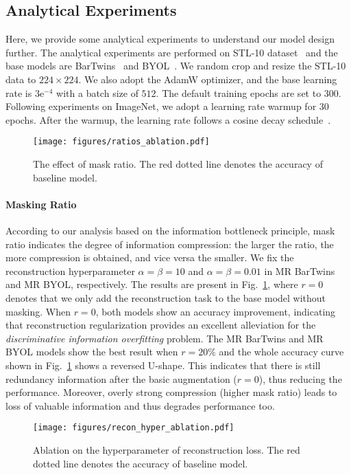 \documentclass[10pt,twocolumn,letterpaper]{article}
\begin{document}
\subsection{Analytical Experiments}
Here, we provide some analytical experiments to understand our model design further. The analytical experiments are performed on STL-10 dataset~\cite{coates2011analysis} and the base models are BarTwins~\cite{zbontar2021barlow} and BYOL~\cite{grill2020bootstrap}. We random crop and resize the STL-10 data to $224\times 224$. We also adopt the AdamW optimizer, and the base learning rate is $3\mathrm{e}^{-4}$ with a batch size of $512$. The default training epochs are set to 300. Following experiments on ImageNet, we adopt a learning rate warmup for 30 epochs. After the warmup, the learning rate follows a cosine decay schedule~\cite{loshchilov2016sgdr}.

\begin{figure}[h!]
    \centering
    \texttt{[image: figures/ratios\_ablation.pdf]}
    \caption{The effect of mask ratio. The red dotted line denotes the accuracy of baseline model.}
    \label{fig:ratio_abl}
\end{figure}
\paragraph{Masking Ratio} According to our analysis based on the information bottleneck principle, mask ratio indicates the degree of information compression: the larger the ratio, the more compression is obtained, and vice versa the smaller. We fix the reconstruction hyperparameter $\alpha=\beta=10$ and $\alpha=\beta=0.01$ in MR BarTwins and MR BYOL, respectively. The results are present in Fig.~\ref{fig:ratio_abl}, where $r=0$ denotes that we only add the reconstruction task to the base model without masking. When $r=0$, both models show an accuracy improvement, indicating that reconstruction regularization provides an excellent alleviation for the \textit{discriminative information overfitting} problem. The MR BarTwins and MR BYOL models show the best result when $r=20\%$ and the whole accuracy curve shown in Fig.~\ref{fig:ratio_abl} shows a reversed U-shape. This indicates that there is still redundancy information after the basic augmentation ($r=0$), thus reducing the performance. Moreover, overly strong compression (higher mask ratio) leads to loss of valuable information and thus degrades performance too. 

\begin{figure}[h!]
    \centering
    \texttt{[image: figures/recon\_hyper\_ablation.pdf]}
    \caption{Ablation on the hyperparameter of reconstruction loss. The red dotted line denotes the accuracy of baseline model.}
    \label{fig:abl2}
\end{figure}
\end{document}
